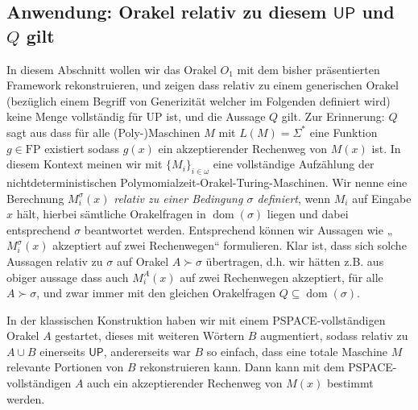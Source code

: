 \documentclass[nofonts]{uebung}
\theoremstyle{definition}
\def\FP{\ensuremath{\mathrm{FP}}}
\def\UP{\ensuremath{\mathrm{UP}}}
\DeclareMathOperator{\dom}{dom}
\def\hUP{\ensuremath{\mathsf{UP}}}
\begin{document}

\subsection{Anwendung: Orakel relativ zu diesem $\hUP$ und $Q$ gilt}

In diesem Abschnitt wollen wir das Orakel $O_1$ mit dem bisher präsentierten Framework rekonstruieren, und zeigen dass relativ zu einem generischen Orakel (bezüglich einem Begriff von Generizität welcher im Folgenden definiert wird) keine Menge vollständig für $\UP$ ist, und die Aussage $Q$ gilt. Zur Erinnerung: $Q$ sagt aus dass für alle (Poly-)Maschinen $M$ mit $L(M)=\Sigma^*$ eine Funktion $g\in\FP$ existiert sodass $g(x)$ ein akzeptierender Rechenweg von $M(x)$ ist.
In diesem Kontext meinen wir mit $\{M_i\}_{i\in\omega}$ eine vollständige Aufzählung der nichtdeterministischen Polymomialzeit-Orakel-Turing-Maschinen.
Wir nenne eine Berechnung $M_i^\sigma(x)$ \emph{relativ zu einer Bedingung $\sigma$ definiert}, wenn $M_i$ auf Eingabe $x$ hält, hierbei sämtliche Orakelfragen in $\dom(\sigma)$ liegen und dabei entsprechend $\sigma$ beantwortet werden.
Entsprechend können wir Aussagen wie „$M_i^\sigma(x)$ akzeptiert auf zwei Rechenwegen“ formulieren.
Klar ist, dass sich solche Aussagen relativ zu $\sigma$ auf Orakel $A\succ \sigma$ übertragen, d.h. wir hätten z.B. aus obiger aussage dass auch $M_i^A(x)$ auf zwei Rechenwegen akzeptiert, für alle $A\succ\sigma$, und zwar immer mit den gleichen Orakelfragen $Q\subseteq \dom(\sigma)$.

In der klassischen Konstruktion haben wir mit einem PSPACE-vollständigen Orakel $A$ gestartet, dieses mit weiteren Wörtern $B$ augmentiert, sodass relativ zu $A\cup B$ einerseits $\hUP$, andererseits war $B$ so einfach, dass eine totale Maschine $M$ relevante Portionen von $B$ rekonstruieren kann. Dann kann mit dem PSPACE-vollständigen $A$ auch ein akzeptierender Rechenweg von $M(x)$ bestimmt werden.
\end{document}
